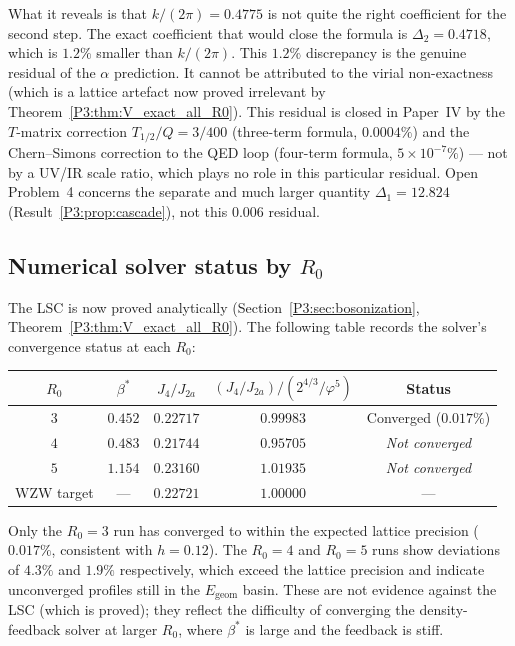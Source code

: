 \documentclass[11pt,a4paper]{article}
\theoremstyle{definition}
\theoremstyle{remark}
\newcommand{\vp}{\varphi}
\newcommand{\bst}{\beta^{*}}
\begin{document}
What it reveals is that $k/(2\pi) = 0.4775$ is not quite the right
coefficient for the second step.  The exact coefficient that would close
the formula is $\Delta_2 = 0.4718$, which is $1.2\%$ smaller than $k/(2\pi)$.
This $1.2\%$ discrepancy is the genuine residual of the $\alpha$ prediction.
It cannot be attributed to the virial non-exactness (which is a lattice
artefact now proved irrelevant by Theorem~\ref{P3:thm:V_exact_all_R0}).
This residual is closed in Paper~IV by the $T$-matrix correction
$T_{1/2}/Q=3/400$ (three-term formula, $0.0004\%$) and the
Chern--Simons correction to the QED loop (four-term formula,
$5\times10^{-7}\%$) --- not by a UV/IR scale ratio, which plays no role
in this particular residual. Open Problem~4 concerns the separate and
much larger quantity $\Delta_1=12.824$ (Result~\ref{P3:prop:cascade}),
not this $0.006$ residual.

\subsection{Numerical solver status by $R_0$}

The LSC is now proved analytically (Section~\ref{P3:sec:bosonization},
Theorem~\ref{P3:thm:V_exact_all_R0}).  The following table records
the solver's convergence status at each $R_0$:

\begin{center}
\renewcommand{\arraystretch}{1.3}
\begin{tabular}{ccccc}
\toprule
$R_0$ & $\bst$ & $J_4/J_{2a}$ & $(J_4/J_{2a})/(2^{4/3}/\vp^5)$ & Status \\
\midrule
$3$ & $0.452$ & $0.22717$ & $0.99983$ & Converged ($0.017\%$) \\
$4$ & $0.483$ & $0.21744$ & $0.95705$ & \emph{Not converged} \\
$5$ & $1.154$ & $0.23160$ & $1.01935$ & \emph{Not converged} \\
\midrule
WZW target & --- & $0.22721$ & $1.00000$ & --- \\
\bottomrule
\end{tabular}
\end{center}

Only the $R_0=3$ run has converged to within the expected lattice
precision ($0.017\%$, consistent with $h=0.12$).  The $R_0=4$ and
$R_0=5$ runs show deviations of $4.3\%$ and $1.9\%$ respectively,
which exceed the lattice precision and indicate unconverged profiles
still in the $E_{\mathrm{geom}}$ basin.
These are not evidence against the LSC (which is proved); they reflect
the difficulty of converging the density-feedback solver at larger $R_0$,
where $\bst$ is large and the feedback is stiff.
\end{document}
